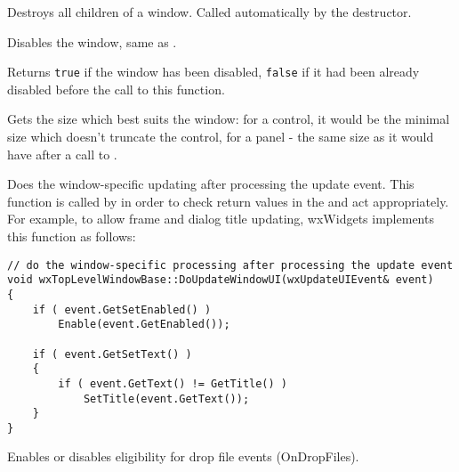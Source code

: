 Destroys all children of a window.  Called automatically by the destructor.


\label{wxwindowdisable}


Disables the window, same as .


Returns {\tt true} if the window has been disabled, {\tt false} if it had been
already disabled before the call to this function.


\label{wxwindowdogetbestsize}


Gets the size which best suits the window: for a control, it would be
the minimal size which doesn't truncate the control, for a panel - the
same size as it would have after a call to .


\label{wxwindowdoupdatewindowui}


Does the window-specific updating after processing the update event.
This function is called by 
in order to check return values in the  and
act appropriately. For example, to allow frame and dialog title updating, wxWidgets
implements this function as follows:

\begin{verbatim}
// do the window-specific processing after processing the update event
void wxTopLevelWindowBase::DoUpdateWindowUI(wxUpdateUIEvent& event)
{
    if ( event.GetSetEnabled() )
        Enable(event.GetEnabled());

    if ( event.GetSetText() )
    {
        if ( event.GetText() != GetTitle() )
            SetTitle(event.GetText());
    }
}
\end{verbatim}



\label{wxwindowdragacceptfiles}


Enables or disables eligibility for drop file events (OnDropFiles).

